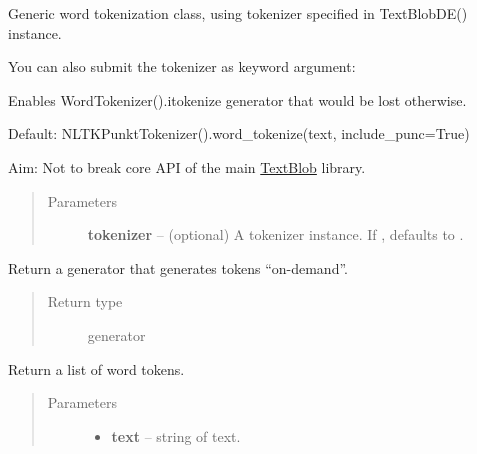 \documentclass[letterpaper,10pt,english]{sphinxmanual}
\begin{document}
\begin{fulllineitems}
\label{api_reference:textblob_de.tokenizers.WordTokenizer}
Generic word tokenization class, using tokenizer specified in
TextBlobDE() instance.

You can also submit the tokenizer as keyword argument:

Enables WordTokenizer().itokenize generator that would be lost otherwise.

Default: NLTKPunktTokenizer().word\_tokenize(text, include\_punc=True)

Aim: Not to break core API of the main \href{http://textblob.readthedocs.org/}{TextBlob} library.
\begin{quote}\begin{description}
\item[{Parameters}] \leavevmode
\textbf{tokenizer} -- (optional) A tokenizer instance. If , defaults to
{\hyperref[api_reference:textblob_de.tokenizers.NLTKPunktTokenizer]{}}.

\end{description}\end{quote}

\begin{fulllineitems}
\label{api_reference:textblob_de.tokenizers.WordTokenizer.itokenize}
Return a generator that generates tokens ``on-demand''.

\begin{quote}\begin{description}
\item[{Return type}] \leavevmode
generator

\end{description}\end{quote}

\end{fulllineitems}


\begin{fulllineitems}
\label{api_reference:textblob_de.tokenizers.WordTokenizer.tokenize}
Return a list of word tokens.
\begin{quote}\begin{description}
\item[{Parameters}] \leavevmode\begin{itemize}
\item {} 
\textbf{text} -- string of text.


\end{itemize}
\end{description}
\end{quote}
\end{fulllineitems}
\end{fulllineitems}
\end{document}
